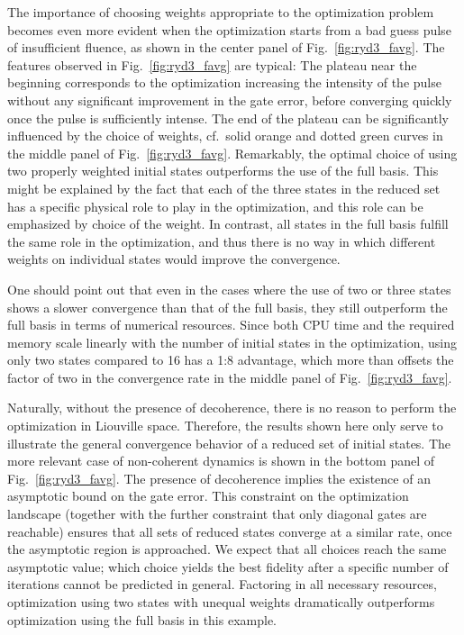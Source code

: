 The importance of choosing weights appropriate to the optimization problem
becomes even more evident when the optimization starts from a bad guess pulse of
insufficient fluence, as shown in the center panel of
Fig.~\ref{fig:ryd3_favg}. The features observed in
Fig.~\ref{fig:ryd3_favg} are typical: The
plateau near the beginning corresponds to the optimization increasing
the intensity of the pulse
without any significant improvement in the gate error, before converging
quickly once the pulse is sufficiently intense. The end of the plateau
can be significantly influenced by the
choice of weights, cf.\ solid orange and dotted green curves in the
middle panel of Fig.~\ref{fig:ryd3_favg}.
Remarkably, the optimal choice of using two properly weighted
initial states outperforms the use of the full basis. This might be explained by the
fact that each of the three states in the reduced set has a specific physical
role to play in the optimization, and this role can be emphasized by choice of
the weight. In contrast, all states in the full basis fulfill the
same role in the optimization, and thus there is no way in which different
weights on individual states would improve the convergence.

One should point out that even in the cases where the use of two or three states
shows a slower convergence than that of the full basis, they still outperform
the full basis in terms of numerical resources. Since both CPU time and the
required memory scale linearly with the number of initial states in the
optimization, using only two states compared to 16 has a 1:8 advantage, which
more than offsets the factor of two in the convergence rate in the
middle panel of Fig.~\ref{fig:ryd3_favg}.

Naturally, without the presence of decoherence, there is no reason to perform
the optimization in Liouville space. Therefore, the results shown here only
serve to illustrate the general convergence behavior of a reduced set of initial
states. The more relevant case of non-coherent dynamics is shown in the bottom
panel of Fig.~\ref{fig:ryd3_favg}. The presence of decoherence implies the
existence of an asymptotic bound on the gate error. This
constraint on the optimization landscape (together with the further constraint
that only diagonal gates are reachable) ensures that all sets of reduced states
converge at a similar rate, once the asymptotic region is approached. We expect
that all choices reach the same asymptotic value; which choice yields the best
fidelity after a specific number of iterations cannot be predicted in general.
Factoring in all necessary resources, optimization using two states with unequal
weights dramatically outperforms optimization
using the full basis in this example.

